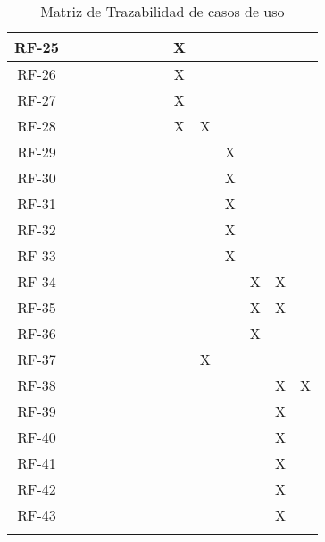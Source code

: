 \begin{center}
\begin{longtable}{ c || c c c c c c c c c c c c c  }
	RF-25 &  &  &  &  &  &  &  & X &  &  &  &  &  \\ \hline
	RF-26 &  &  &  &  &  &  &  & X &  &  &  &  &  \\ \hline
	RF-27 &  &  &  &  &  &  &  & X &  &  &  &  &  \\ \hline
	RF-28 &  &  &  &  &  &  &  & X & X &  &  &  &  \\ \hline
	RF-29 &  &  &  &  &  &  &  &  &  & X &  &  &  \\ \hline
	RF-30 &  &  &  &  &  &  &  &  &  & X &  &  &  \\ \hline
	RF-31 &  &  &  &  &  &  &  &  &  & X &  &  &  \\ \hline
	RF-32 &  &  &  &  &  &  &  &  &  & X &  &  &  \\ \hline
	RF-33 &  &  &  &  &  &  &  &  &  & X &  &  &  \\ \hline
	RF-34 &  &  &  &  &  &  &  &  &  &  & X & X &  \\ \hline
	RF-35 &  &  &  &  &  &  &  &  &  &  & X & X &  \\ \hline
	RF-36 &  &  &  &  &  &  &  &  &  &  & X &  &  \\ \hline
	RF-37 &  &  &  &  &  &  &  &  & X &  &  &  &  \\ \hline
	RF-38 &  &  &  &  &  &  &  &  &  &  &  & X & X \\ \hline
	RF-39 &  &  &  &  &  &  &  &  &  &  &  & X &  \\ \hline
	RF-40 &  &  &  &  &  &  &  &  &  &  &  & X &  \\ \hline
	RF-41 &  &  &  &  &  &  &  &  &  &  &  & X &  \\ \hline
	RF-42 &  &  &  &  &  &  &  &  &  &  &  & X &  \\ \hline
	RF-43 &  &  &  &  &  &  &  &  &  &  &  & X &  \\ \hline
\caption{Matriz de Trazabilidad de casos de uso}
\label{tab:matriztraz}
\end{longtable}
\end{center}
